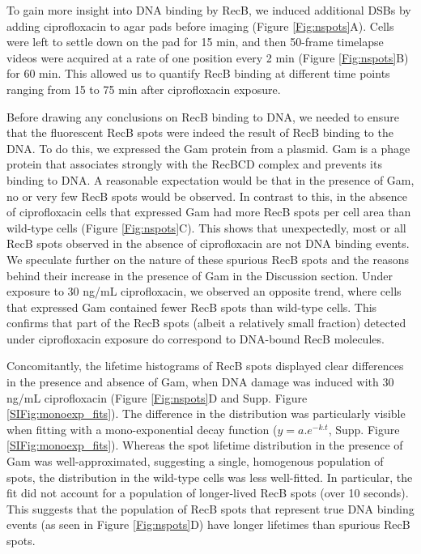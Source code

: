 To gain more insight into DNA binding by RecB, we induced additional DSBs by adding ciprofloxacin to agar pads before imaging (Figure \ref{Fig:nspots}A). Cells were left to settle down on the pad for 15 min, and then 50-frame timelapse videos were acquired at a rate of one position every 2 min (Figure \ref{Fig:nspots}B) for 60 min. This allowed us to quantify RecB binding at different time points ranging from 15 to 75 min after ciprofloxacin exposure.

Before drawing any conclusions on RecB binding to DNA, we needed to ensure that the fluorescent RecB spots were indeed the result of RecB binding to the DNA. To do this, we expressed the Gam protein from a plasmid. Gam is a phage protein that associates strongly with the RecBCD complex and prevents its binding to DNA. A reasonable expectation would be that in the presence of Gam, no or very few RecB spots would be observed. In contrast to this, in the absence of ciprofloxacin cells that expressed Gam had more RecB spots per cell area than wild-type cells (Figure \ref{Fig:nspots}C). This shows that unexpectedly, most or all RecB spots observed in the absence of ciprofloxacin are not DNA binding events. We speculate further on the nature of these spurious RecB spots and the reasons behind their increase in the presence of Gam in the Discussion section.
Under exposure to 30 ng/mL ciprofloxacin, we observed an opposite trend, where cells that expressed Gam contained fewer RecB spots than wild-type cells. This confirms that part of the RecB spots (albeit a relatively small fraction) detected under ciprofloxacin exposure do correspond to DNA-bound RecB molecules.

Concomitantly, the lifetime histograms of RecB spots displayed clear differences in the presence and absence of Gam, when DNA damage was induced with 30 ng/mL ciprofloxacin (Figure \ref{Fig:nspots}D and Supp. Figure \ref{SIFig:monoexp_fits}). The difference in the distribution was particularly visible when fitting with a mono-exponential decay function ($y=a.e^{-k.t}$, Supp. Figure \ref{SIFig:monoexp_fits}). Whereas the spot lifetime distribution in the presence of Gam was well-approximated, suggesting a single, homogenous population of spots, the distribution in the wild-type cells was less well-fitted. In particular, the fit did not account for a population of longer-lived RecB spots (over 10 seconds). This suggests that the population of RecB spots that represent true DNA binding events (as seen in Figure \ref{Fig:nspots}D) have longer lifetimes than spurious RecB spots.

